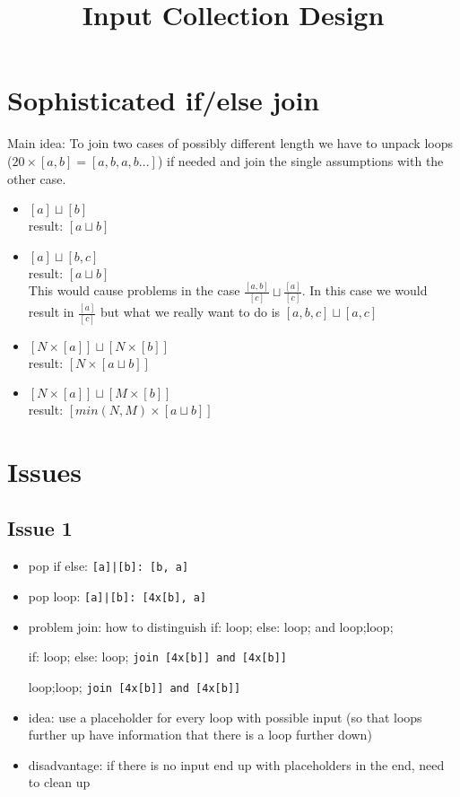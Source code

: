\documentclass[11pt]{article}
\begin{document}
\title{Input Collection Design}

\maketitle


\section{Sophisticated if/else join}

Main idea: To join two cases of possibly different length we have to unpack loops ($20 \times [a, b] = [a, b, a, b ...]$) if needed and join the single assumptions with the other case.

\begin{itemize}
  \item $[a] \sqcup [b]$\\
  result: $[a \sqcup b]$
  \item $[a] \sqcup [b, c]$\\
  result: $[a \sqcup b]$\\
  This would cause problems in the case $\frac{[a, b]}{[c]} \sqcup \frac{[a]}{[c]}$. In this case we would result in $\frac{[a]}{[c]}$ but what we really want to do is $[a, b, c] \sqcup [a, c]$
  \item $[N \times [a]] \sqcup [N \times [b]]$\\
  result: $[N \times [a \sqcup b]]$
  \item $[N \times [a]] \sqcup [M \times [b]]$\\
  result: $[min(N,M) \times [a \sqcup b]]$
\end{itemize}


\section{Issues}

\subsection{Issue 1}

\begin{itemize}
\item pop if else: \verb/[a]|[b]: [b, a]/
\item pop loop: \verb/[a]|[b]: [4x[b], a]/
\item problem join: how to distinguish if: loop; else: loop; and loop;loop;

if: loop; else: loop; \verb/join [4x[b]] and [4x[b]]/

loop;loop; \verb/join [4x[b]] and [4x[b]]/

\item idea: use a placeholder for every loop with possible input (so that loops further up have information that there is a loop further down)
\item disadvantage: if there is no input end up with placeholders in the end, need to clean up
\end{itemize}
\end{document}
